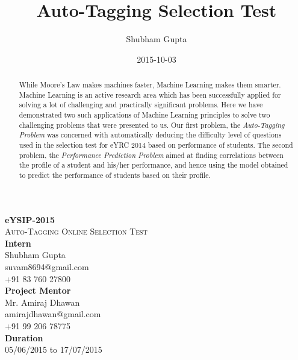 \documentclass[12pt]{article}
\title{Auto-Tagging Selection Test}
\date{2015-10-03}
\author{Shubham Gupta}
\begin{document}
	\begin{titlepage}
		\begin{center}
			\vspace*{20mm}
			\LARGE
			\textbf{eYSIP-2015}\\
			\vspace{15mm}
			\Huge\textsc{Auto-Tagging Online Selection Test}\\
			\vfill
			\Large
			\textbf{Intern}\\
			Shubham Gupta\\
			suvam8694@gmail.com\\
			+91 83 760 27800\\
			\vspace{10mm}
			\textbf{Project Mentor}\\
			Mr. Amiraj Dhawan\\
			amirajdhawan@gmail.com\\
			+91 99 206 78775\\
			\vspace{10mm}
			\textbf{Duration}\\
			05/06/2015 to 17/07/2015
			\vspace{20mm}
		\end{center}
	\end{titlepage}
	
	
	\tableofcontents
	
	
	
	\newpage
	\begin{abstract}
		While Moore's Law makes machines faster, Machine Learning
		makes them smarter. Machine Learning is an active research
		area which has been successfully applied for solving a lot of
		challenging and practically significant problems.
		Here we have demonstrated two such applications of Machine Learning
		principles to solve two challenging problems that were presented
		to us.
		Our first problem, the \textit{Auto-Tagging Problem} was concerned 
		with automatically deducing the difficulty level of questions used
		in the selection test for eYRC 2014 based on performance of students.
		The second problem, the \textit{Performance Prediction Problem} aimed at finding
		correlations between the profile of a student and his/her performance,
		and hence using the model obtained to predict the performance of
		students based on their profile.
	\end{abstract}
	
	
	\newpage
	
\end{document}
